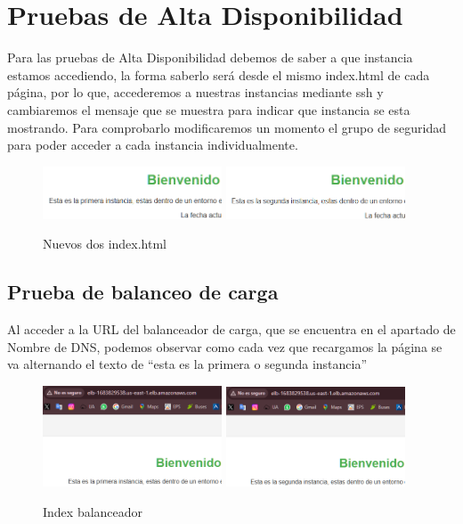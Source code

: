 \documentclass{article}
\begin{document}
\section{Pruebas de Alta Disponibilidad}

	Para las pruebas de Alta Disponibilidad debemos de saber a que instancia estamos accediendo, la forma saberlo será desde el mismo index.html de cada página, por lo que, accederemos a nuestras instancias mediante ssh y cambiaremos el mensaje que se muestra para indicar que instancia se esta mostrando. Para comprobarlo modificaremos un momento el grupo de seguridad para poder acceder a cada instancia individualmente.

	\begin{figure}[H]
	\centering
	\includegraphics[width=0.475\textwidth]{PrimeraInstancia.png}
	\includegraphics[width=0.475\textwidth]{SegundaInstancia.png}
	\caption{Nuevos dos index.html}
	\end{figure}
	 


\subsection{Prueba de balanceo de carga}
	Al acceder a la URL del balanceador de carga, que se encuentra en el apartado de Nombre de DNS, podemos observar como cada vez que recargamos la página se va alternando el texto de ``esta es la primera o segunda instancia''
	\begin{figure}[H]
	\centering
	\includegraphics[width=0.475\textwidth]{index_balanceo_1.png}
	\includegraphics[width=0.475\textwidth]{index_balanceo_2.png}
	\caption{Index balanceador}
	\end{figure}
\end{document}
